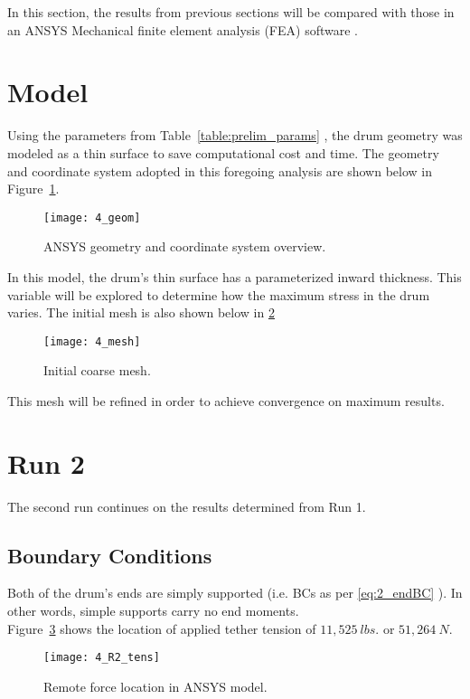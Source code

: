 In this section, the results from previous sections will be compared with those in an ANSYS Mechanical finite element analysis (FEA) software \cite{ANSYS}.

\section{Model}

Using the parameters from Table~\ref{table:prelim_params} , the drum geometry was modeled as a thin surface to save computational cost and time. The geometry and coordinate system adopted in this foregoing analysis are shown below in Figure~\ref{fig:4_geom}.

\begin{figure}[H]
	\centering
	\texttt{[image: 4\_geom]}
	\caption{ANSYS geometry and coordinate system overview.}
	\label{fig:4_geom}
\end{figure}

In this model, the drum's thin surface has a parameterized inward thickness. This variable will be explored to determine how the maximum stress in the drum varies. The initial mesh is also shown below in \ref{fig:4_mesh}

\begin{figure}[H]
	\centering
	\texttt{[image: 4\_mesh]}
	\caption{Initial coarse mesh.}
	\label{fig:4_mesh}
\end{figure}

This mesh will be refined in order to achieve convergence on maximum results.


\section{Run 2}

The second run continues on the results determined from Run 1.

\subsection{Boundary Conditions}

Both of the drum's ends are simply supported (i.e. BCs as per \ref{eq:2_endBC} ). In other words, simple supports carry no end moments.\\

Figure~\ref{fig:4_R2_tens} shows the location of applied tether tension of $11,525\ lbs.$ or $51,264\ N$.
\begin{figure}[H]
	\centering
	\texttt{[image: 4\_R2\_tens]}
	\caption{Remote force location in ANSYS model.}
	\label{fig:4_R2_tens}
\end{figure}

